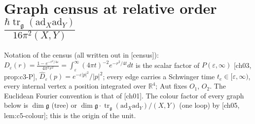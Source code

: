 \documentclass[11pt]{report}
\theoremstyle{plain}
\theoremstyle{definition}
\numberwithin{equation}{chapter}
\newcommand{\unit}{\tfrac{\hbar\operatorname{tr}_{\mathfrak g}(\mathrm{ad}_X\mathrm{ad}_Y)}{16\pi^2(X,Y)}}
\begin{document}
\section{Graph census at relative order $\unit$}
\label{sec:t-census}

Notation of the census (all written out in [census]): $D_\varepsilon(r)=\frac{1-e^{-r^2/4\varepsilon}}{4\pi^2r^2}=\int_\varepsilon^\infty(4\pi t)^{-2}e^{-r^2/4t}dt$ is the scalar factor of $P(\varepsilon,\infty)$ [ch03, prop:c3-P], $\hat D_\varepsilon(p)=e^{-\varepsilon|p|^2}/|p|^2$; every edge carries a Schwinger time $t_e\in[\varepsilon,\infty)$, every internal vertex a position integrated over $\mathbb R^4$; $\mathrm{Aut}$ fixes $O_1$, $O_2$. The Euclidean Fourier convention is that of [ch01]. The colour factor of every graph below is $\dim\mathfrak g$ (tree) or $\dim\mathfrak g\cdot\operatorname{tr}_{\mathfrak g}(\mathrm{ad}_X\mathrm{ad}_Y)/(X,Y)$ (one loop) by [ch05, lem:c5-colour]; this is the origin of the unit.
\end{document}
